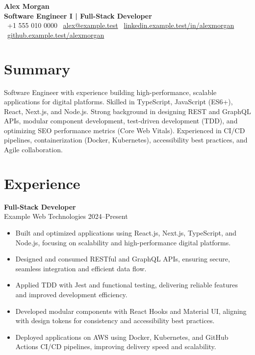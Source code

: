 \documentclass[a4paper,11pt]{article}
\begin{document}
\vspace*{-4pt}
\begin{center}
    {\Huge \textbf{Alex Morgan}}\\[1pt]
    {\color{gray}\textbf{Software Engineer I | Full-Stack Developer}}\\[6pt]
    \small
    \textbullet\ +1 555 010 0000 \textbullet\ \href{mailto:alex@example.test}{alex@example.test} \textbullet\
    \href{https://linkedin.example.test/in/alexmorgan}{linkedin.example.test/in/alexmorgan} \textbullet\
    \href{https://github.example.test/alexmorgan}{github.example.test/alexmorgan}
\end{center}

\section*{Summary}
Software Engineer with experience building high-performance, scalable applications for digital platforms. Skilled in TypeScript, JavaScript (ES6+), React, Next.js, and Node.js. Strong background in designing REST and GraphQL APIs, modular component development, test-driven development (TDD), and optimizing SEO performance metrics (Core Web Vitals). Experienced in CI/CD pipelines, containerization (Docker, Kubernetes), accessibility best practices, and Agile collaboration.

\section*{Experience}

\textbf{Full-Stack Developer} \\
Example Web Technologies \hfill 2024--Present
\begin{itemize}
    \item Built and optimized applications using React.js, Next.js, TypeScript, and Node.js, focusing on scalability and high-performance digital platforms.
    \item Designed and consumed RESTful and GraphQL APIs, ensuring secure, seamless integration and efficient data flow.
    \item Applied TDD with Jest and functional testing, delivering reliable features and improved development efficiency.
    \item Developed modular components with React Hooks and Material UI, aligning with design tokens for consistency and accessibility best practices.
    \item Deployed applications on AWS using Docker, Kubernetes, and GitHub Actions CI/CD pipelines, improving delivery speed and scalability.
\end{itemize}
\end{document}
